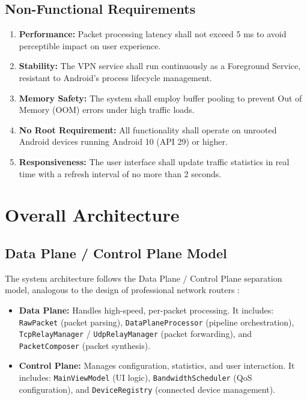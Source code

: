 \subsection{Non-Functional Requirements}

\begin{enumerate}[label=\textbf{NFR\arabic*.}]
    \item \textbf{Performance:} Packet processing latency shall not exceed 5 ms to avoid perceptible impact on user experience.
    \item \textbf{Stability:} The VPN service shall run continuously as a Foreground Service, resistant to Android's process lifecycle management.
    \item \textbf{Memory Safety:} The system shall employ buffer pooling to prevent Out of Memory (OOM) errors under high traffic loads.
    \item \textbf{No Root Requirement:} All functionality shall operate on unrooted Android devices running Android 10 (API 29) or higher.
    \item \textbf{Responsiveness:} The user interface shall update traffic statistics in real time with a refresh interval of no more than 2 seconds.
\end{enumerate}


\section{Overall Architecture}
\label{sec:architecture}

\subsection{Data Plane / Control Plane Model}

The system architecture follows the Data Plane / Control Plane separation model, analogous to the design of professional network routers \cite{kurose2021computer}:

\begin{itemize}
    \item \textbf{Data Plane:} Handles high-speed, per-packet processing. It includes: \texttt{RawPacket} (packet parsing), \texttt{DataPlaneProcessor} (pipeline orchestration), \texttt{TcpRelayManager} / \texttt{UdpRelayManager} (packet forwarding), and \texttt{PacketComposer} (packet synthesis).
    
    \item \textbf{Control Plane:} Manages configuration, statistics, and user interaction. It includes: \texttt{MainViewModel} (UI logic), \texttt{BandwidthScheduler} (QoS configuration), and \texttt{DeviceRegistry} (connected device management).
\end{itemize}

